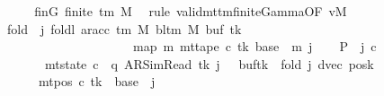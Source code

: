 \begin{isabellebody}
%
\isadelimproof
%
\endisadelimproof
%
\isatagproof
{}\isamarkupfalse%
\ {\isacharminus}{\kern0pt}\isanewline
\ \ \isamarkupfalse%
\ finG{\isacharcolon}{\kern0pt}\ {\isachardoublequoteopen}finite\ {\isacharparenleft}{\kern0pt}{\isasymGamma}{\isacharunderscore}{\kern0pt}tm\ M{\isacharparenright}{\kern0pt}{\isachardoublequoteclose}\ \isamarkupfalse%
\ {\isacharparenleft}{\kern0pt}rule\ valid{\isacharunderscore}{\kern0pt}mttm{\isacharunderscore}{\kern0pt}finite{\isacharunderscore}{\kern0pt}Gamma{\isacharbrackleft}{\kern0pt}OF\ vM{\isacharbrackright}{\kern0pt}{\isacharparenright}{\kern0pt}\isanewline
\ \ \isamarkupfalse%
\ {\isacharquery}{\kern0pt}fold\ {\isacharequal}{\kern0pt}\ {\isachardoublequoteopen}{\isasymlambda}j{\isachardot}{\kern0pt}\ foldl\ {\isacharparenleft}{\kern0pt}ar{\isacharunderscore}{\kern0pt}acc\ {\isacharparenleft}{\kern0pt}{\isasymGamma}{\isacharunderscore}{\kern0pt}tm\ M{\isacharparenright}{\kern0pt}\ {\isacharparenleft}{\kern0pt}bl{\isacharunderscore}{\kern0pt}tm\ M{\isacharparenright}{\kern0pt}{\isacharparenright}{\kern0pt}\ {\isacharparenleft}{\kern0pt}buf{}\ tk{\isacharparenright}{\kern0pt}\isanewline
\ \ \ \ \ \ \ \ \ \ \ \ \ \ \ \ \ \ \ \ \ {\isacharparenleft}{\kern0pt}map\ {\isacharparenleft}{\kern0pt}{\isasymlambda}m{\isachardot}{\kern0pt}\ mt{\isacharunderscore}{\kern0pt}tape\ c{\isacharprime}{\kern0pt}\ tk\ {\isacharparenleft}{\kern0pt}base\ {\isacharplus}{\kern0pt}\ m{\isacharparenright}{\kern0pt}{\isacharparenright}{\kern0pt}\ {\isacharbrackleft}{\kern0pt}{}{\isachardot}{\kern0pt}{\isachardot}{\kern0pt}{\isacharless}{\kern0pt}j{\isacharbrackright}{\kern0pt}{\isacharparenright}{\kern0pt}{\isachardoublequoteclose}\isanewline
\ \ \isamarkupfalse%
\ {\isacharquery}{\kern0pt}P\ {\isacharequal}{\kern0pt}\ {\isachardoublequoteopen}{\isasymlambda}j\ c{\isachardot}{\kern0pt}\isanewline
\ \ \ \ \ \ \ mt{\isacharunderscore}{\kern0pt}state\ c\ {\isacharequal}{\kern0pt}\ {\isacharparenleft}{\kern0pt}q{\isacharcomma}{\kern0pt}\ AR{\isacharunderscore}{\kern0pt}SimRead{\isacharcomma}{\kern0pt}\ tk{\isacharcomma}{\kern0pt}\ j\ {\isacharplus}{\kern0pt}\ {}{\isacharcomma}{\kern0pt}\ buf{}{\isacharparenleft}{\kern0pt}tk\ {\isacharcolon}{\kern0pt}{\isacharequal}{\kern0pt}\ {\isacharquery}{\kern0pt}fold\ j{\isacharparenright}{\kern0pt}{\isacharcomma}{\kern0pt}\ dvec{\isacharcomma}{\kern0pt}\ posk{\isacharparenright}{\kern0pt}\isanewline
\ \ \ \ \ {\isasymand}\ mt{\isacharunderscore}{\kern0pt}pos\ c\ tk\ {\isacharequal}{\kern0pt}\ base\ {\isacharplus}{\kern0pt}\ j\isanewline

\end{isabellebody}
